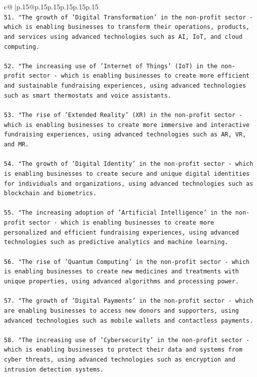\documentclass{article}
\begin{document}
{\begin{supertabular}{c@{$\;$}|p{.15\linewidth}@{}p{.15\linewidth}p{.15\linewidth}p{.15\linewidth}p{.15\linewidth}p{.15\linewidth}}
{{{\\ 
\texttt{51. "The growth of 'Digital Transformation' in the non{-}profit sector {-} which is enabling businesses to transform their operations, products, and services using advanced technologies such as AI, IoT, and cloud computing.} \\
\\ 
\texttt{52. "The increasing use of 'Internet of Things' (IoT) in the non{-}profit sector {-} which is enabling businesses to create more efficient and sustainable fundraising experiences, using advanced technologies such as smart thermostats and voice assistants.} \\
\\ 
\texttt{53. "The rise of 'Extended Reality' (XR) in the non{-}profit sector {-} which is enabling businesses to create more immersive and interactive fundraising experiences, using advanced technologies such as AR, VR, and MR.} \\
\\ 
\texttt{54. "The growth of 'Digital Identity' in the non{-}profit sector {-} which is enabling businesses to create secure and unique digital identities for individuals and organizations, using advanced technologies such as blockchain and biometrics.} \\
\\ 
\texttt{55. "The increasing adoption of 'Artificial Intelligence' in the non{-}profit sector {-} which is enabling businesses to create more personalized and efficient fundraising experiences, using advanced technologies such as predictive analytics and machine learning.} \\
\\ 
\texttt{56. "The rise of 'Quantum Computing' in the non{-}profit sector {-} which is enabling businesses to create new medicines and treatments with unique properties, using advanced algorithms and processing power.} \\
\\ 
\texttt{57. "The growth of 'Digital Payments' in the non{-}profit sector {-} which are enabling businesses to access new donors and supporters, using advanced technologies such as mobile wallets and contactless payments.} \\
\\ 
\texttt{58. "The increasing use of 'Cybersecurity' in the non{-}profit sector {-} which is enabling businesses to protect their data and systems from cyber threats, using advanced technologies such as encryption and intrusion detection systems.} \\
}}}
\end{supertabular}}
\end{document}
